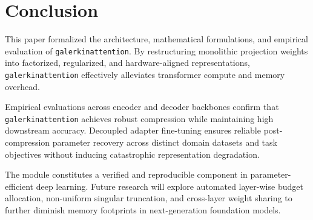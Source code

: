 \section{Conclusion}
This paper formalized the architecture, mathematical formulations, and empirical evaluation of \texttt{galerkinattention}. By restructuring monolithic projection weights into factorized, regularized, and hardware-aligned representations, \texttt{galerkinattention} effectively alleviates transformer compute and memory overhead.

Empirical evaluations across encoder and decoder backbones confirm that \texttt{galerkinattention} achieves robust compression while maintaining high downstream accuracy. Decoupled adapter fine-tuning ensures reliable post-compression parameter recovery across distinct domain datasets and task objectives without inducing catastrophic representation degradation.

The module constitutes a verified and reproducible component in parameter-efficient deep learning. Future research will explore automated layer-wise budget allocation, non-uniform singular truncation, and cross-layer weight sharing to further diminish memory footprints in next-generation foundation models.
